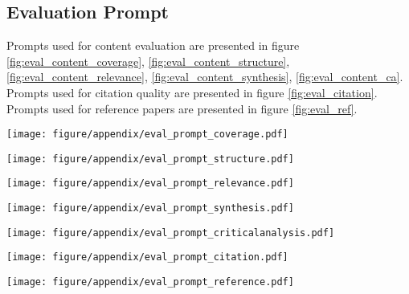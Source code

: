 \subsection{Evaluation Prompt}
\label{subsec:Evaluation Prompt}
Prompts used for content evaluation are presented in figure \ref{fig:eval_content_coverage}, \ref{fig:eval_content_structure}, \ref{fig:eval_content_relevance},
\ref{fig:eval_content_synthesis},
\ref{fig:eval_content_ca}.
Prompts used for citation quality are presented in figure \ref{fig:eval_citation}.
Prompts used for reference papers are presented in figure \ref{fig:eval_ref}.
\begin{figure*}[h]
  \centering
    \texttt{[image: figure/appendix/eval\_prompt\_coverage.pdf]}
  \caption{Content coverage prompt for evaluation.}
  \label{fig:eval_content_coverage}
\end{figure*}
\begin{figure*}[h]
  \centering
    \texttt{[image: figure/appendix/eval\_prompt\_structure.pdf]}
  \caption{Content structure prompt for evaluation.}
  \label{fig:eval_content_structure}
\end{figure*}
\begin{figure*}[h]
  \centering
    \texttt{[image: figure/appendix/eval\_prompt\_relevance.pdf]}
  \caption{Content relevance prompt for evaluation.}
  \label{fig:eval_content_relevance}
\end{figure*}
\begin{figure*}[h]
  \centering
    \texttt{[image: figure/appendix/eval\_prompt\_synthesis.pdf]}
  \caption{Content synthesis prompt for evaluation.}
  \label{fig:eval_content_synthesis}
\end{figure*}
\begin{figure*}[h]
  \centering
    \texttt{[image: figure/appendix/eval\_prompt\_criticalanalysis.pdf]}
  \caption{Content critical analysis prompt for evaluation.}
  \label{fig:eval_content_ca}
\end{figure*}
\begin{figure*}[h]
  \centering
    \texttt{[image: figure/appendix/eval\_prompt\_citation.pdf]}
  \caption{Citation prompt for evaluation.}
  \label{fig:eval_citation}
\end{figure*}
\begin{figure*}[h]
  \centering
    \texttt{[image: figure/appendix/eval\_prompt\_reference.pdf]}
  \caption{Judge relevance for reference paper.}
  \label{fig:eval_ref}
\end{figure*}

